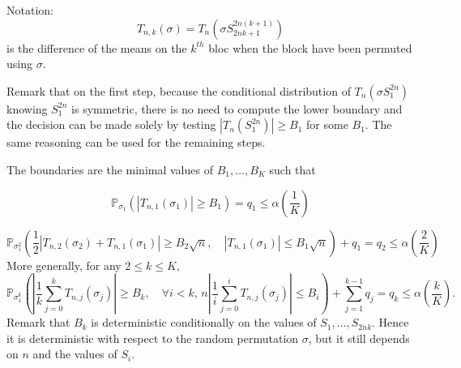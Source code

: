 \documentclass{article}
\theoremstyle{plain}
\theoremstyle{remark}
\renewcommand{\P}{\mathbb{P}}
\newcommand{\1}{\mathbbm{1}}
\numberwithin{equation}{section}
\begin{document}
Notation:
$$T_{n,k}(\sigma)=T_n\left(\sigma S_{2nk+1}^{2n(k+1)}\right) $$
is the difference of the means on the $k^{th}$ bloc when the block have been permuted using $\sigma$.

Remark that on the first step, because the conditional distribution of $T_n(\sigma S_1^{2n})$ knowing $S_1^{2n}$ is symmetric, there is no need to compute the lower boundary and the decision can be made solely by testing $|T_n(S_1^{2n})|\ge B_1$ for some $B_1$. The same reasoning can be used for the remaining steps.

The boundaries are the minimal values of $B_1,\dots, B_K$ such that

$$\P_{\sigma_1}(|T_{n,1}(\sigma_1)|\ge B_1) = q_1 \le \alpha\left(\frac{1}{K}\right) $$

$$\P_{\sigma_1^2}\left( \frac{1}{2}|T_{n,2}(\sigma_2)+T_{n,1}(\sigma_1)|\ge  B_2\sqrt{n},\quad  |T_{n,1}(\sigma_1)|\le  B_1\sqrt{n}  \right)+q_1 = q_2 \le\alpha\left(\frac{2}{K}\right) $$
More generally, for any $2\le k\le K$,
\begin{equation}\label{eq:def_Bk}
\P_{\sigma_1^k}\left(\left|\frac{1}{k}\sum_{j=0}^k T_{n,j}(\sigma_j)\right|\ge B_{k}, \quad \forall i < k,\,  n\left|\frac{1}{i}\sum_{j=0}^i T_{n,j}\left(\sigma_j\right)\right|\le  B_i\right)+\sum_{j=1}^{k-1}q_j  = q_k \le\alpha\left(\frac{k}{K}\right).
\end{equation}
Remark that $B_k$ is deterministic conditionally on the values of $S_1,\dots,S_{2nk}$. Hence it is deterministic with respect to the random permutation $\sigma$, but it still depends on $n$ and the values of $S_i$.
\end{document}
